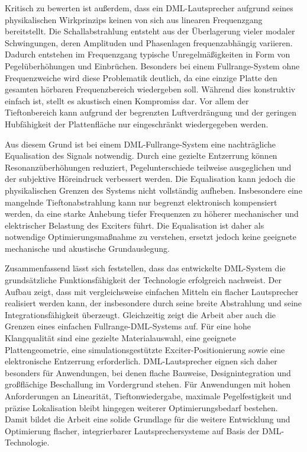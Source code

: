 Kritisch zu bewerten ist außerdem, dass ein DML-Lautsprecher aufgrund seines physikalischen Wirkprinzips keinen von sich aus linearen Frequenzgang bereitstellt. Die Schallabstrahlung entsteht aus der Überlagerung vieler modaler Schwingungen, deren Amplituden und Phasenlagen frequenzabhängig variieren. Dadurch entstehen im Frequenzgang typische Unregelmäßigkeiten in Form von Pegelüberhöhungen und Einbrüchen. Besonders bei einem Fullrange-System ohne Frequenzweiche wird diese Problematik deutlich, da eine einzige Platte den gesamten hörbaren Frequenzbereich wiedergeben soll. Während dies konstruktiv einfach ist, stellt es akustisch einen Kompromiss dar. Vor allem der Tieftonbereich kann aufgrund der begrenzten Luftverdrängung und der geringen Hubfähigkeit der Plattenfläche nur eingeschränkt wiedergegeben werden.

Aus diesem Grund ist bei einem DML-Fullrange-System eine nachträgliche Equalisation des Signals notwendig. Durch eine gezielte Entzerrung können Resonanzüberhöhungen reduziert, Pegelunterschiede teilweise ausgeglichen und der subjektive Höreindruck verbessert werden. Die Equalisation kann jedoch die physikalischen Grenzen des Systems nicht vollständig aufheben. Insbesondere eine mangelnde Tieftonabstrahlung kann nur begrenzt elektronisch kompensiert werden, da eine starke Anhebung tiefer Frequenzen zu höherer mechanischer und elektrischer Belastung des Exciters führt. Die Equalisation ist daher als notwendige Optimierungsmaßnahme zu verstehen, ersetzt jedoch keine geeignete mechanische und akustische Grundauslegung.

Zusammenfassend lässt sich feststellen, dass das entwickelte DML-System die grundsätzliche Funktionsfähigkeit der Technologie erfolgreich nachweist. Der Aufbau zeigt, dass mit vergleichsweise einfachen Mitteln ein flacher Lautsprecher realisiert werden kann, der insbesondere durch seine breite Abstrahlung und seine Integrationsfähigkeit überzeugt. Gleichzeitig zeigt die Arbeit aber auch die Grenzen eines einfachen Fullrange-DML-Systems auf. Für eine hohe Klangqualität sind eine gezielte Materialauswahl, eine geeignete Plattengeometrie, eine simulationsgestützte Exciter-Positionierung sowie eine elektronische Entzerrung erforderlich. DML-Lautsprecher eignen sich daher besonders für Anwendungen, bei denen flache Bauweise, Designintegration und großflächige Beschallung im Vordergrund stehen. Für Anwendungen mit hohen Anforderungen an Linearität, Tieftonwiedergabe, maximale Pegelfestigkeit und präzise Lokalisation bleibt hingegen weiterer Optimierungsbedarf bestehen. Damit bildet die Arbeit eine solide Grundlage für die weitere Entwicklung und Optimierung flacher, integrierbarer Lautsprechersysteme auf Basis der DML-Technologie.



